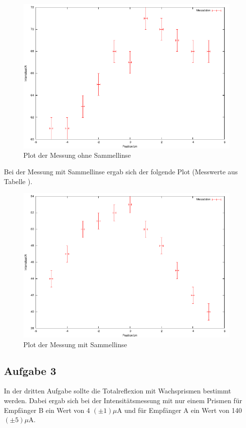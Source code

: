 \documentclass[12pt]{scrartcl}
\begin{document}
\begin{figure}[H]
\centering
    \includegraphics[scale = 1]{a_2_o.pdf}
  	\caption[Plot der Messung ohne Sammellinse]{Plot der Messung ohne Sammellinse}
  \label{fig:a_2_o}
\end{figure}

Bei der Messung mit Sammellinse ergab sich der folgende Plot (Messwerte aus Tabelle 
).


\begin{figure}[H]
\centering
    \includegraphics[scale = 1]{a_2_m.pdf}
  	\caption[Plot der Messung mit Sammellinse]{Plot der Messung mit Sammellinse}
  \label{fig:a_2_m}
\end{figure}



\subsection{Aufgabe 3}
In der dritten Aufgabe sollte die Totalreflexion mit Wachsprismen bestimmt werden.
Dabei ergab  sich bei der Intensitätsmessung mit nur einem Prismen  für Empfänger B ein Wert von 4	$(\pm 1) \mu$A und für Empfänger A ein Wert von 140 $(\pm 5) \mu$A.
\end{document}
